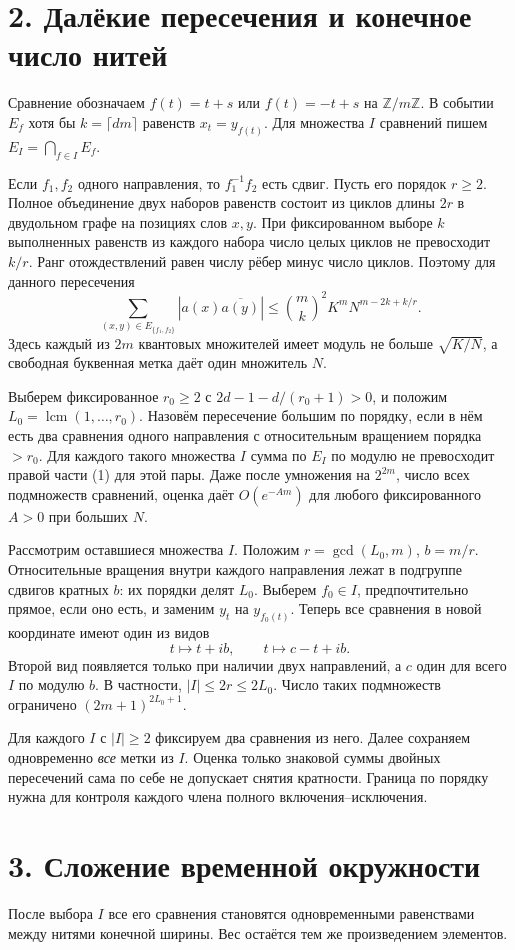 \documentclass[11pt,a4paper]{article}
\newcommand{\Z}{\mathbb Z}
\newcommand{\sect}[1]{\section*{\sffamily\color{ink}#1}}
\begin{document}
\newpage
\sect{2. Далёкие пересечения и конечное число нитей}
Сравнение обозначаем \(f(t)=t+s\) или \(f(t)=-t+s\) на \(\Z/m\Z\).
В событии \(E_f\) хотя бы \(k=\lceil dm\rceil\) равенств \(x_t=y_{f(t)}\).
Для множества \(I\) сравнений пишем \(E_I=\bigcap_{f\in I} E_f\).

Если \(f_1,f_2\) одного направления, то \(f_1^{-1}f_2\) есть сдвиг. Пусть его порядок \(r\ge2\). Полное объединение двух наборов равенств состоит из циклов длины \(2r\) в двудольном графе на позициях слов \(x,y\). При фиксированном выборе \(k\) выполненных равенств из каждого набора число целых циклов не превосходит \(k/r\). Ранг отождествлений равен числу рёбер минус число циклов. Поэтому для данного пересечения
\[
 \sum_{(x,y)\in E_{\{f_1,f_2\}}}|a(x)\overline{a(y)}|
       \le \binom{m}{k}^2 K^m N^{m-2k+k/r}.                  \tag{1}
\]
Здесь каждый из \(2m\) квантовых множителей имеет модуль не больше
\(\sqrt{K/N}\), а свободная буквенная метка даёт один множитель \(N\).

Выберем фиксированное \(r_0\ge2\) с
\(2d-1-d/(r_0+1)>0\), и положим \(L_0=\operatorname{lcm}(1,\ldots,r_0)\).
Назовём пересечение большим по порядку, если в нём есть два сравнения одного направления с относительным вращением порядка \(>r_0\). Для каждого такого множества \(I\) сумма по \(E_I\) по модулю не превосходит правой части (1) для этой пары. Даже после умножения на \(2^{2m}\), число всех подмножеств сравнений, оценка даёт \(O(e^{-Am})\) для любого фиксированного \(A>0\) при больших \(N\).

Рассмотрим оставшиеся множества \(I\). Положим \(r=\gcd(L_0,m)\), \(b=m/r\). Относительные вращения внутри каждого направления лежат в подгруппе сдвигов кратных \(b\): их порядки делят \(L_0\). Выберем \(f_0\in I\), предпочтительно прямое, если оно есть, и заменим \(y_t\) на \(y_{f_0(t)}\). Теперь все сравнения в новой координате имеют один из видов
\[
                    t\longmapsto t+ib,\qquad
                    t\longmapsto c-t+ib .
\]
Второй вид появляется только при наличии двух направлений, а \(c\) один для всего \(I\) по модулю \(b\). В частности, \(|I|\le2r\le2L_0\).
Число таких подмножеств ограничено \((2m+1)^{2L_0+1}\).

Для каждого \(I\) с \(|I|\ge2\) фиксируем два сравнения из него. Далее сохраняем одновременно \emph{все} метки из \(I\). Оценка только знаковой суммы двойных пересечений сама по себе не допускает снятия кратности. Граница по порядку нужна для контроля каждого члена полного включения--исключения.

\newpage
\sect{3. Сложение временной окружности}
После выбора \(I\) все его сравнения становятся одновременными равенствами между нитями конечной ширины. Вес остаётся тем же произведением элементов.
\end{document}

